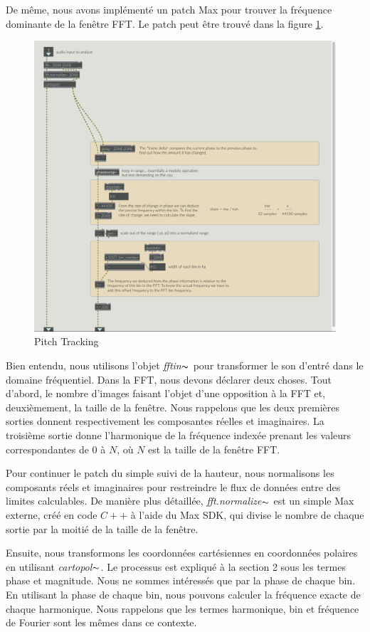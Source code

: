 De même, nous avons implémenté un patch Max pour trouver la fréquence dominante de la fenêtre FFT. Le patch peut être trouvé dans la figure \ref{PitchTracking}.

    \begin{figure}
        \centering
        \includegraphics[width = 0.7 \textwidth ]{Graphs/fftTrack.png}
        \caption{Pitch Tracking}
        \label{PitchTracking}
    \end{figure}

Bien entendu, nous utilisons l'objet  \textit{fftin}$\thicksim $ pour transformer le son d’entré dans le domaine fréquentiel. Dans la FFT, nous devons déclarer deux choses. Tout d'abord, le nombre d'images faisant l'objet d'une opposition à la FFT et, deuxièmement, la taille de la fenêtre. Nous rappelons que les deux premières sorties donnent respectivement les composantes réelles et imaginaires. La troisième sortie donne l'harmonique de la fréquence indexée prenant les valeurs correspondantes de $ 0 $ à $ N $, où $ N $ est la taille de la fenêtre FFT.

Pour continuer le patch du simple suivi de la hauteur, nous normalisons les composants réels et imaginaires pour restreindre le flux de données entre des limites calculables. De manière plus détaillée, \textit{fft.normalize}$\thicksim $ est un simple Max externe, créé en code $C++$ à l'aide du Max SDK, qui divise le nombre de chaque sortie par la moitié de la taille de la fenêtre.

Ensuite, nous transformons les coordonnées cartésiennes en coordonnées polaires en utilisant \textit{cartopol}$\thicksim $. Le processus est expliqué à la section 2 sous les termes phase et magnitude. Nous ne sommes intéressés que par la phase de chaque bin. En utilisant la phase de chaque bin, nous pouvons calculer la fréquence exacte de chaque harmonique. Nous rappelons que les termes harmonique, bin et fréquence de Fourier sont les mêmes dans ce contexte.

